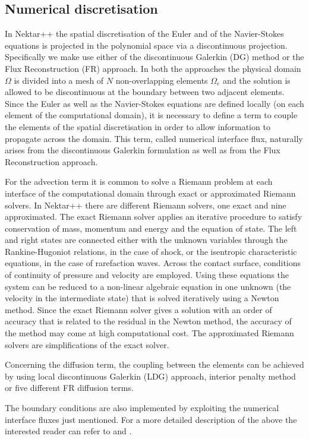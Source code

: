 \subsection{Numerical discretisation}
In Nektar++ the spatial discretisation of the Euler and of the Navier-Stokes
equations is projected in the polynomial space via a discontinuous projection.
Specifically we make use either of the discontinuous Galerkin (DG) method
or the Flux Reconstruction (FR) approach.
In both the approaches the physical domain $\Omega$ is divided into a mesh
of $N$ non-overlapping elements $\Omega_{e}$ and the solution is allowed
to be discontinuous at the boundary between two adjacent elements.
Since the Euler as well as the Navier-Stokes equations are defined locally
(on each element of the computational domain), it is necessary to define
a term to couple the elements of the spatial discretisation in order to allow
information to propagate across the domain. This term, called numerical
interface flux, naturally arises from the discontinuous Galerkin formulation
as well as from the Flux Reconstruction approach.

For the advection term it is common to solve a Riemann problem at each
interface of the computational domain through exact or approximated Riemann
solvers. In Nektar++ there are different Riemann solvers, one exact and nine
approximated. The exact Riemann solver applies an iterative procedure to
satisfy conservation of mass, momentum and energy and the equation of
state. The left and right states are connected either with the unknown variables
through the Rankine-Hugoniot relations, in the case of shock, or the isentropic
characteristic equations, in the case of rarefaction waves. Across the contact
surface, conditions of continuity of pressure and velocity are employed.
Using these equations the system can be reduced to a non-linear algebraic
equation in one unknown (the velocity in the intermediate state) that is solved
iteratively using a Newton method. Since the exact Riemann solver gives
a solution with an order of accuracy that is related to the residual in the
Newton method, the accuracy of the method may come at high computational
cost. The approximated Riemann solvers are simplifications of the exact solver.

Concerning the diffusion term, the coupling between the elements can be achieved
by using local discontinuous Galerkin (LDG) approach, interior penalty method or
five different FR diffusion terms.

The boundary conditions are also implemented by exploiting the numerical
interface fluxes just mentioned.
For a more detailed description of the above the interested reader can refer
to \cite{DeGMen14} and \cite{MenDeG14}.

